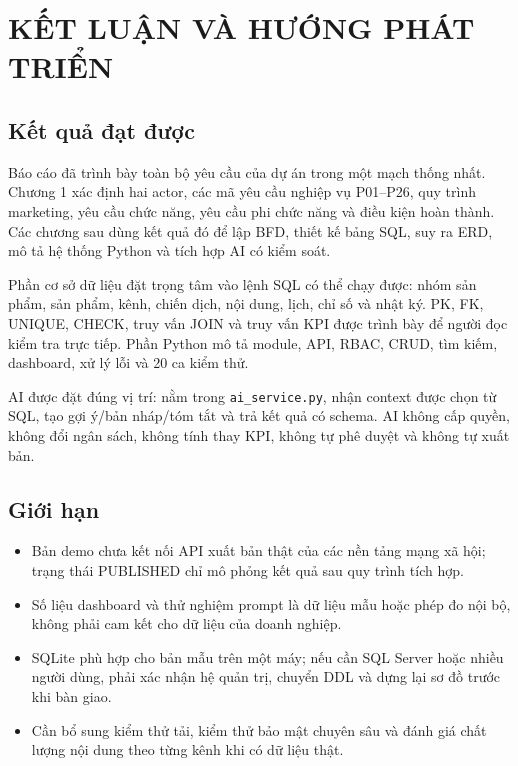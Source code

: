 \chapter{KẾT LUẬN VÀ HƯỚNG PHÁT TRIỂN}
\enlargethispage{4\baselineskip}

\section{Kết quả đạt được}

Báo cáo đã trình bày toàn bộ yêu cầu của dự án trong một mạch thống nhất. Chương 1 xác định hai actor, các mã yêu cầu nghiệp vụ P01--P26, quy trình marketing, yêu cầu chức năng, yêu cầu phi chức năng và điều kiện hoàn thành. Các chương sau dùng kết quả đó để lập BFD, thiết kế bảng SQL, suy ra ERD, mô tả hệ thống Python và tích hợp AI có kiểm soát.

Phần cơ sở dữ liệu đặt trọng tâm vào lệnh SQL có thể chạy được: nhóm sản phẩm, sản phẩm, kênh, chiến dịch, nội dung, lịch, chỉ số và nhật ký. PK, FK, UNIQUE, CHECK, truy vấn JOIN và truy vấn KPI được trình bày để người đọc kiểm tra trực tiếp. Phần Python mô tả module, API, RBAC, CRUD, tìm kiếm, dashboard, xử lý lỗi và 20 ca kiểm thử.

AI được đặt đúng vị trí: nằm trong \texttt{ai\_service.py}, nhận context được chọn từ SQL, tạo gợi ý/bản nháp/tóm tắt và trả kết quả có schema. AI không cấp quyền, không đổi ngân sách, không tính thay KPI, không tự phê duyệt và không tự xuất bản.

\section{Giới hạn}

\begin{itemize}
  \item Bản demo chưa kết nối API xuất bản thật của các nền tảng mạng xã hội; trạng thái PUBLISHED chỉ mô phỏng kết quả sau quy trình tích hợp.
  \item Số liệu dashboard và thử nghiệm prompt là dữ liệu mẫu hoặc phép đo nội bộ, không phải cam kết cho dữ liệu của doanh nghiệp.
  \item SQLite phù hợp cho bản mẫu trên một máy; nếu cần SQL Server hoặc nhiều người dùng, phải xác nhận hệ quản trị, chuyển DDL và dựng lại sơ đồ trước khi bàn giao.
  \item Cần bổ sung kiểm thử tải, kiểm thử bảo mật chuyên sâu và đánh giá chất lượng nội dung theo từng kênh khi có dữ liệu thật.
\end{itemize}

